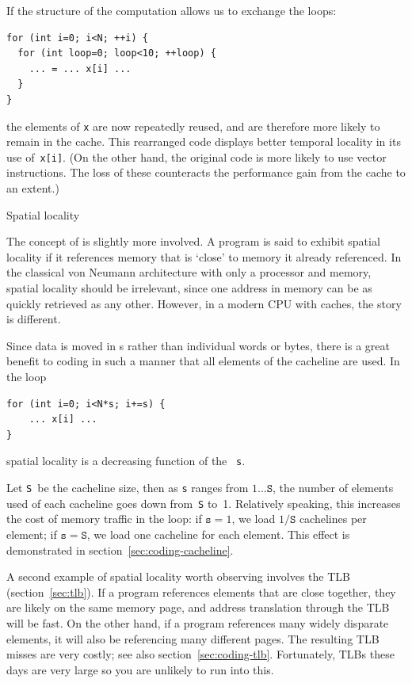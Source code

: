 If the structure of the computation allows us to exchange
the loops:
\begin{lstlisting}
for (int i=0; i<N; ++i) {
  for (int loop=0; loop<10; ++loop) {
    ... = ... x[i] ...
  }
}
\end{lstlisting}
the elements of \texttt{x} are now repeatedly reused, and are
therefore more likely to remain in the cache.
This rearranged code displays better
temporal locality in its use of~\lstinline{x[i]}.
(On the other hand, the original code is more likely
to use vector instructions. The loss of these counteracts
the performance gain from the cache to an extent.)


 {Spatial locality}


The concept of  is slightly more
involved. A program is said to exhibit spatial locality if it
references memory that is `close' to memory it already referenced. In
the classical von Neumann architecture with only a processor and
memory, spatial locality should be irrelevant, since one address in
memory can be as quickly  retrieved as any other. However, in a modern \ac{CPU}
with caches, the story is different. 

Since data is moved in s rather than
  individual words or bytes,
  there is a great benefit to coding in such a manner that all
  elements of the cacheline are used. In the loop
\begin{lstlisting}
for (int i=0; i<N*s; i+=s) {
    ... x[i] ...
}
\end{lstlisting}
  spatial locality is a decreasing function of the
  ~\lstinline{s}.

  Let \lstinline{S}~be the cacheline size, then as \lstinline{s} ranges from $1\ldots\mathtt{S}$,
  the number of elements used of each cacheline goes
  down from~\lstinline{S} to~1. Relatively speaking, this increases the cost
  of memory traffic in the loop: if $\mathtt{s}=1$, we load $1/\mathtt{S}$ cachelines
  per element; if $\mathtt{s}=\mathtt{S}$, we load one cacheline for each element. This
  effect is demonstrated in section~\ref{sec:coding-cacheline}.


A second example of spatial locality worth observing involves
  the \ac{TLB} (section~\ref{sec:tlb}). If a program references
  elements that are close together, they are likely on the same memory
  page, and address translation through the TLB will be fast. On the
  other hand, if a program references many widely disparate elements,
  it will also be referencing many different pages.
  The resulting TLB
  misses are very
    costly; see also section~\ref{sec:coding-tlb}.
Fortunately, \acp{TLB} these days are very large so you are
unlikely to run into this.

